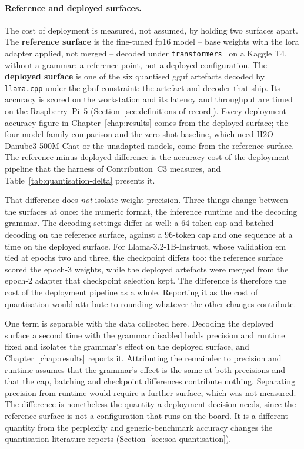 \paragraph{Reference and deployed surfaces.} The cost of deployment is measured, not assumed, by
holding two surfaces apart. The \textbf{reference surface} is the fine-tuned fp16 model -- base
weights with the \acrshort{lora} adapter applied, not merged -- decoded under
\texttt{transformers}~\cite{transformers} on a Kaggle T4, without a grammar: a reference point, not
a deployed configuration. The \textbf{deployed surface} is one of the six quantised \gls{gguf}
artefacts decoded by \texttt{llama.cpp} under the \gls{gbnf} constraint: the artefact and decoder
that ship. Its accuracy is scored on the workstation and its latency and throughput are timed on the
Raspberry~Pi~5 (Section~\ref{sec:definitions-of-record}). Every deployment accuracy figure in
Chapter~\ref{chap:results} comes from the deployed surface; the four-model family comparison and the
zero-shot baseline, which need H2O-Danube3-500M-Chat or the unadapted models, come from the
reference surface. The reference-minus-deployed difference is the accuracy cost of the deployment
pipeline that the harness of Contribution~C3 measures, and Table~\ref{tab:quantisation-delta}
presents it.

That difference does \emph{not} isolate weight precision. Three things change between the surfaces
at once: the numeric format, the inference runtime and the decoding grammar. The decoding settings
differ as well: a 64-token cap and batched decoding on the reference surface, against a
96-token cap and one sequence at a time on the deployed surface. For Llama-3.2-1B-Instruct, whose
validation \gls{em} tied at epochs two and three, the checkpoint differs too: the reference
surface scored the epoch-3 weights, while the deployed artefacts were merged from the epoch-2
adapter that checkpoint selection kept. The difference is therefore the cost of the deployment
pipeline as a whole. Reporting it as the cost of quantisation would attribute to rounding whatever
the other changes contribute.

One term is separable with the data collected here. Decoding the deployed surface a second time with
the grammar disabled holds precision and runtime fixed and isolates the grammar's effect on the
deployed surface, and Chapter~\ref{chap:results} reports it. Attributing the remainder to precision
and runtime assumes that the grammar's effect is the same at both precisions and that the cap,
batching and checkpoint differences contribute nothing. Separating precision
from runtime would require a further surface, which was not measured. The difference is nonetheless
the quantity a deployment decision needs, since the reference surface is not a configuration that
runs on the board. It is a different quantity from the perplexity and generic-benchmark accuracy
changes the quantisation literature reports (Section~\ref{sec:soa-quantisation}).

